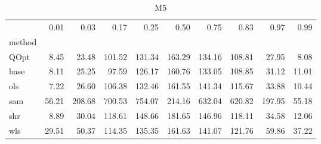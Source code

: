 \begin{table}
\caption{M5}
\label{ }
\begin{tabular}{lrrrrrrrrr}
\toprule
 & 0.01 & 0.03 & 0.17 & 0.25 & 0.50 & 0.75 & 0.83 & 0.97 & 0.99 \\
method &  &  &  &  &  &  &  &  &  \\
\midrule
QOpt & 8.45 & 23.48 & 101.52 & 131.34 & 163.29 & 134.16 & 108.81 & 27.95 & 8.08 \\
base & 8.11 & 25.25 & 97.59 & 126.17 & 160.76 & 133.05 & 108.85 & 31.12 & 11.01 \\
ols & 7.22 & 26.60 & 106.38 & 132.46 & 161.55 & 141.34 & 115.67 & 33.88 & 10.44 \\
sam & 56.21 & 208.68 & 700.53 & 754.07 & 214.16 & 632.04 & 620.82 & 197.95 & 55.18 \\
shr & 8.89 & 30.04 & 118.61 & 148.66 & 181.65 & 146.96 & 118.11 & 34.58 & 12.06 \\
wls & 29.51 & 50.37 & 114.35 & 135.35 & 161.63 & 141.07 & 121.76 & 59.86 & 37.22 \\
\bottomrule
\end{tabular}
\end{table}
